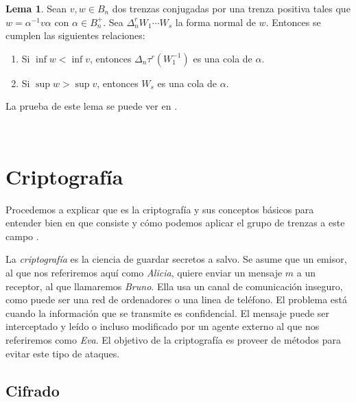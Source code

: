 \documentclass[12pt]{book}
\theoremstyle{definition}
\newtheorem{lema}{Lema}[section]
\begin{document}
\begin{lema}
Sean $v,w\in B_n$ dos trenzas conjugadas por una trenza positiva tales que $w = \alpha^{-1}v\alpha$ con $\alpha\in B_n^{+}$. Sea $\Delta^r_n W_1\cdots W_s$ la forma normal de $w$. Entonces se cumplen las siguientes relaciones:
\begin{enumerate}
\item Si $\inf w < \inf v$, entonces $\Delta_n\tau^r(W_1^{-1})$ es una cola de $\alpha$.
\item Si $\sup w > \sup v$, entonces $W_s$ es una cola de $\alpha$.
\end{enumerate}
\label{lema:criptoanalisis}
\end{lema}
La prueba de este lema se puede ver en \cite{Alg}.






























\ 
\newline
\newline

\chapter{Criptografía}
Procedemos a explicar que es la criptografía y sus conceptos básicos para entender bien en que consiste y cómo podemos aplicar el grupo de trenzas a este campo \cite{in_cr}.

La \textit{criptografía} es la ciencia de guardar secretos a salvo. Se asume que un emisor, al que nos referiremos aquí como \textit{Alicia}, quiere enviar un mensaje $m$ a un receptor, al que llamaremos \textit{Bruno}. Ella usa un canal de comunicación inseguro, como puede ser una red de ordenadores o una linea de teléfono. El problema está cuando la información que se transmite es confidencial. El mensaje puede ser interceptado y leído o incluso modificado por un agente externo al que nos referiremos como \textit{Eva}. El objetivo de la criptografía es proveer de métodos para evitar este tipo de ataques.

\section{Cifrado}
\end{document}
